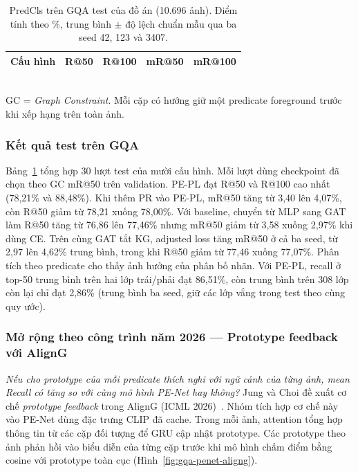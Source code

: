 \begin{table}[!t]\centering\small
\caption{PredCls trên GQA test của đồ án (10.696 ảnh). Điểm tính theo \%,
trung bình $\pm$ độ lệch chuẩn mẫu qua ba seed 42, 123 và 3407.}
\label{tab:gqatest}
\begin{tabular}{@{}lrrrr@{}}\toprule
Cấu hình & R@50 & R@100 & mR@50 & mR@100\\\midrule

\end{tabular}\\[2pt]
{\footnotesize GC = \textit{Graph Constraint}. Mỗi cặp có hướng giữ một
predicate foreground trước khi xếp hạng trên toàn ảnh.}
\end{table}

\subsubsection{Kết quả test trên GQA}
Bảng~\ref{tab:gqatest} tổng hợp 30 lượt test của mười cấu hình. Mỗi lượt dùng
checkpoint đã chọn theo GC mR@50 trên validation.
PE-PL đạt R@50 và R@100 cao nhất (78,21\% và 88,48\%). Khi thêm PR vào
PE-PL, mR@50 tăng từ 3,40 lên 4,07\%, còn R@50 giảm từ 78,21 xuống
78,00\%. Với baseline, chuyển từ MLP sang GAT làm R@50 tăng từ 76,86 lên
77,46\% nhưng mR@50 giảm từ 3,58 xuống 2,97\% khi dùng CE.
Trên cùng GAT tắt KG, adjusted loss tăng mR@50 ở cả ba seed,
từ 2,97 lên 4,62\% trung bình, trong khi R@50 giảm từ 77,46 xuống
77,07\%.
Phân tích theo predicate cho thấy ảnh hưởng của phân bố nhãn. Với PE-PL,
recall ở top-50 trung bình trên hai lớp trái/phải đạt 86,51\%, còn trung bình
trên 308 lớp còn lại chỉ đạt 2,86\% (trung bình ba seed, giữ các lớp vắng
trong test theo cùng quy ước).

\subsubsection{Mở rộng theo công trình năm 2026 --- Prototype feedback với AlignG}
\textit{Nếu cho prototype của mỗi predicate thích nghi với ngữ cảnh của
từng ảnh, mean Recall có tăng so với cùng mô hình PE-Net hay không?}
Jung và Choi đề xuất cơ chế \textit{prototype feedback} trong AlignG
(ICML 2026)~\cite{jung2026aligng}. Nhóm tích hợp cơ chế này vào PE-Net dùng
đặc trưng CLIP đã cache. Trong mỗi ảnh, attention tổng hợp thông tin từ các
cặp đối tượng để GRU cập nhật prototype. Các prototype theo ảnh phản hồi
vào biểu diễn của từng cặp trước khi mô hình chấm điểm bằng cosine với
prototype toàn cục (Hình~\ref{fig:gqa-penet-aligng}).

